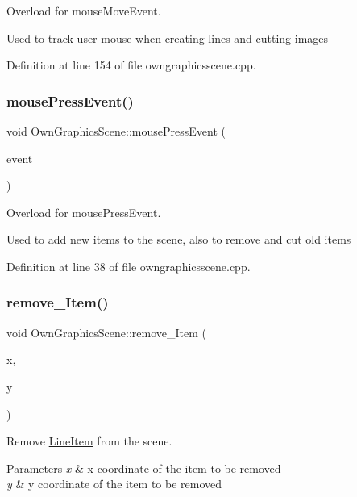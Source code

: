 Overload for mouse\+Move\+Event. 

Used to track user mouse when creating lines and cutting images 

Definition at line 154 of file owngraphicsscene.\+cpp.

\mbox{\label{classOwnGraphicsScene_a1a9916971af608d5331483606f72fbe4}} 
\subsubsection{\texorpdfstring{mouse\+Press\+Event()}{mousePressEvent()}}
{\footnotesize\ttfamily void Own\+Graphics\+Scene\+::mouse\+Press\+Event (\begin{DoxyParamCaption}\item[{Q\+Graphics\+Scene\+Mouse\+Event $\ast$}]{event }\end{DoxyParamCaption})}



Overload for mouse\+Press\+Event. 

Used to add new items to the scene, also to remove and cut old items 

Definition at line 38 of file owngraphicsscene.\+cpp.

\mbox{\label{classOwnGraphicsScene_a5b4b466a697f83c23294a80067edac23}} 
\subsubsection{\texorpdfstring{remove\+\_\+\+Item()}{remove\_Item()}}
{\footnotesize\ttfamily void Own\+Graphics\+Scene\+::remove\+\_\+\+Item (\begin{DoxyParamCaption}\item[{unsigned}]{x,  }\item[{unsigned}]{y }\end{DoxyParamCaption})}



Remove \mbox{\hyperlink{classLineItem}{Line\+Item}} from the scene. 


\begin{DoxyParams}{Parameters}
{\em x} & x coordinate of the item to be removed \\
\hline
{\em y} & y coordinate of the item to be removed \\
\hline
\end{DoxyParams}


